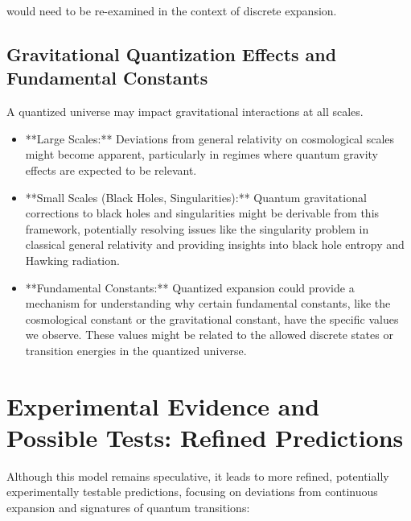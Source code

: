 \documentclass[12pt,a4paper]{article}
\begin{document}
	would need to be re-examined in the context of discrete expansion.
	
	\subsection{Gravitational Quantization Effects and Fundamental Constants}
	A quantized universe may impact gravitational interactions at all scales.
	
	\begin{itemize}
		\item **Large Scales:** Deviations from general relativity on cosmological scales might become apparent, particularly in regimes where quantum gravity effects are expected to be relevant.
		\item **Small Scales (Black Holes, Singularities):**  Quantum gravitational corrections to black holes and singularities might be derivable from this framework, potentially resolving issues like the singularity problem in classical general relativity and providing insights into black hole entropy and Hawking radiation.
		\item **Fundamental Constants:** Quantized expansion could provide a mechanism for understanding why certain fundamental constants, like the cosmological constant or the gravitational constant, have the specific values we observe.  These values might be related to the allowed discrete states or transition energies in the quantized universe.
	\end{itemize}
	
	
	\section{Experimental Evidence and Possible Tests: Refined Predictions}
	
	Although this model remains speculative, it leads to more refined, potentially experimentally testable predictions, focusing on deviations from continuous expansion and signatures of quantum transitions:
	
\end{document}
